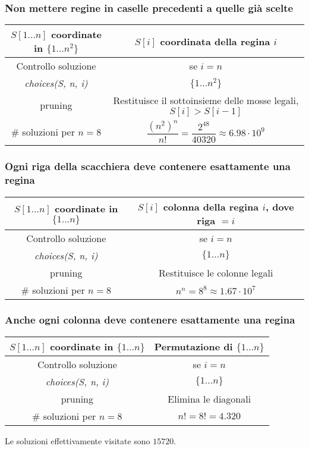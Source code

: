 \subsubsection{Non mettere regine in caselle precedenti a quelle gi\`a scelte}
\begin{center}
\begin{tabular}{|c|c|}
	\hline
	$S[1\dots n]$ coordinate in $\{1\dots n^2\}$ & $S[i]$ coordinata della regina $i$\\
	\hline
	Controllo soluzione & se $i = n$ \\
	\hline
	\emph{choices(S, n, i)} & $\{1\dots n^2\}$\\
	\hline
	pruning & \makecell{Restituisce il sottoinsieme\\ delle mosse legali, $S[i]>S[i-1]$}\\
	\hline
	$\#$ soluzioni per $n=8$ & $\dfrac{(n^2)^n}{n!} = \dfrac{2^{48}}{40320}\approx 6.98\cdot 10^{9}$\\
	\hline
\end{tabular}
\end{center}
\subsubsection{Ogni riga della scacchiera deve contenere esattamente una regina}
\begin{center}
\begin{tabular}{|c|c|}
	\hline
	$S[1\dots n]$ coordinate in $\{1\dots n\}$ & $S[i]$ colonna della regina $i$, dove riga $= i$\\
	\hline
	Controllo soluzione & se $i = n$ \\
	\hline
	\emph{choices(S, n, i)} & $\{1\dots n\}$\\
	\hline
	pruning & Restituisce le colonne legali\\
	\hline
	$\#$ soluzioni per $n=8$ & $n^n = 8^8\approx 1.67\cdot 10^{7}$\\
	\hline
\end{tabular}
\end{center}
\subsubsection{Anche ogni colonna deve contenere esattamente una regina}
\begin{center}
\begin{tabular}{|c|c|}
	\hline
	$S[1\dots n]$ coordinate in $\{1\dots n\}$ & Permutazione di $\{1\dots n\}$\\
	\hline
	Controllo soluzione & se $i = n$ \\
	\hline
	\emph{choices(S, n, i)} & $\{1\dots n\}$\\
	\hline
	pruning & Elimina le diagonali\\
	\hline
	$\#$ soluzioni per $n=8$ & $n! = 8! = 4.320$\\
	\hline
\end{tabular}
\end{center}
Le soluzioni effettivamente visitate sono $15720$.
